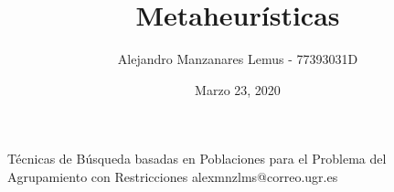 \documentclass[10pt]{report}
\author{Alejandro Manzanares Lemus - 77393031D}
\title{Metaheurísticas}
\date{Marzo 23, 2020}
\begin{document}
				{Técnicas de Búsqueda basadas en Poblaciones para el Problema del Agrupamiento con Restricciones}
            {alexmnzlms@correo.ugr.es}

\tableofcontents

% 
% 
% 
% 
% 












\end{document}
